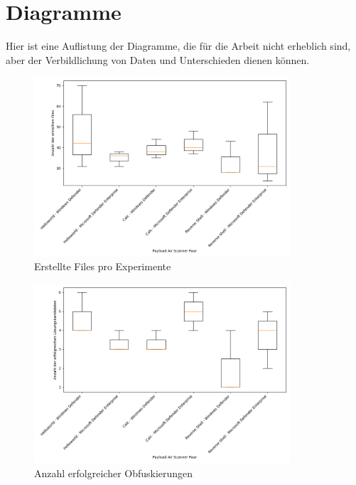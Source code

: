 \chapter{Diagramme}
Hier ist eine Auflistung der Diagramme, die für die Arbeit nicht erheblich sind, aber der Verbildlichung von Daten und Unterschieden dienen können.

\begin{figure}[h]
    \centering
    \includegraphics[width=0.85\textwidth]{gfx/Desktriptiv/files_overview.png}
    \caption{Erstellte Files pro Experimente}
    \label{fig:files_overview}
\end{figure}
\begin{figure}[h]
    \centering
    \includegraphics[width=0.85\textwidth]{gfx/Desktriptiv/evaded_overview.png}
    \caption{Anzahl erfolgreicher Obfuskierungen}
    \label{fig:evaded_overview}
\end{figure}
